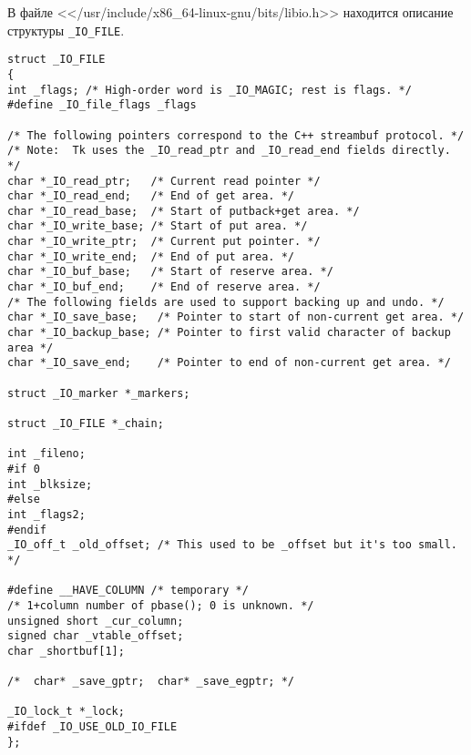 В файле <</usr/include/x86\_64-linux-gnu/bits/libio.h>> находится описание структуры \texttt{\_IO\_FILE}.
\begin{lstlisting}
struct _IO_FILE
{
int _flags; /* High-order word is _IO_MAGIC; rest is flags. */
#define _IO_file_flags _flags

/* The following pointers correspond to the C++ streambuf protocol. */
/* Note:  Tk uses the _IO_read_ptr and _IO_read_end fields directly. */
char *_IO_read_ptr;   /* Current read pointer */
char *_IO_read_end;   /* End of get area. */
char *_IO_read_base;  /* Start of putback+get area. */
char *_IO_write_base; /* Start of put area. */
char *_IO_write_ptr;  /* Current put pointer. */
char *_IO_write_end;  /* End of put area. */
char *_IO_buf_base;   /* Start of reserve area. */
char *_IO_buf_end;    /* End of reserve area. */
/* The following fields are used to support backing up and undo. */
char *_IO_save_base;   /* Pointer to start of non-current get area. */
char *_IO_backup_base; /* Pointer to first valid character of backup area */
char *_IO_save_end;    /* Pointer to end of non-current get area. */

struct _IO_marker *_markers;

struct _IO_FILE *_chain;

int _fileno;
#if 0
int _blksize;
#else
int _flags2;
#endif
_IO_off_t _old_offset; /* This used to be _offset but it's too small.  */

#define __HAVE_COLUMN /* temporary */
/* 1+column number of pbase(); 0 is unknown. */
unsigned short _cur_column;
signed char _vtable_offset;
char _shortbuf[1];

/*  char* _save_gptr;  char* _save_egptr; */

_IO_lock_t *_lock;
#ifdef _IO_USE_OLD_IO_FILE
};
\end{lstlisting}
